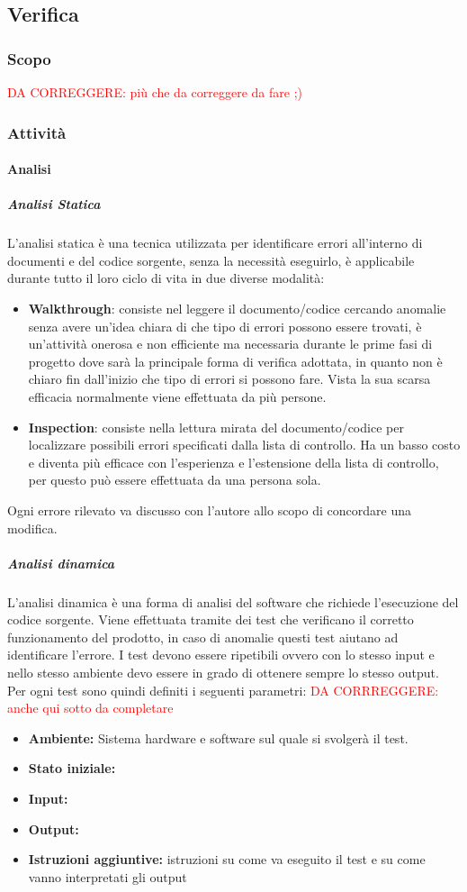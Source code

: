 \subsection{Verifica}

	\subsubsection{Scopo}
	\textcolor{red}{DA CORREGGERE: più che da correggere da fare ;)}
	\subsubsection{Attività}
		\paragraph{Analisi}
			\subparagraph{Analisi Statica} \Spazio
			L'analisi statica è una tecnica utilizzata per identificare errori all'interno di documenti e del codice sorgente, senza la necessità eseguirlo, è applicabile durante tutto il loro ciclo di vita in due diverse modalità:
			\begin{itemize}
				\item \textbf{Walkthrough}:
				consiste nel leggere il documento/codice cercando anomalie senza avere un'idea chiara di che tipo di errori possono essere trovati, è un'attività onerosa e non efficiente ma necessaria durante le prime fasi di progetto dove sarà la principale forma di verifica adottata, in quanto non è chiaro fin dall'inizio che tipo di errori si possono fare.
				Vista la sua scarsa efficacia normalmente viene effettuata da più persone.
				\item \textbf{Inspection}: 
				consiste nella lettura mirata del documento/codice per localizzare possibili errori specificati dalla lista di controllo. Ha un basso costo e diventa più efficace con l'esperienza e l'estensione della lista di controllo, per questo può essere effettuata da una persona sola.
			\end{itemize}
		    Ogni errore rilevato va discusso con l'autore allo scopo di concordare una modifica.
			\subparagraph{Analisi dinamica} \Spazio
			L'analisi dinamica è una forma di analisi del software che richiede l'esecuzione del codice sorgente. Viene effettuata tramite dei test che verificano il corretto funzionamento del prodotto, in caso di anomalie questi test aiutano ad identificare l'errore.
			I test devono essere ripetibili ovvero con lo stesso input e nello stesso ambiente devo essere in grado di ottenere sempre lo stesso output. Per ogni test sono quindi definiti i seguenti parametri:
			\textcolor{red}{DA CORRREGGERE: anche qui sotto da completare}
			\begin{itemize}
				
				\item \textbf{Ambiente:} Sistema hardware e software sul quale si svolgerà il test.
				\item \textbf{Stato iniziale:}
				\item \textbf{Input:}
				\item \textbf{Output:}
				\item \textbf{Istruzioni aggiuntive:} istruzioni su come va eseguito il test e su come vanno interpretati gli output
			\end{itemize}
